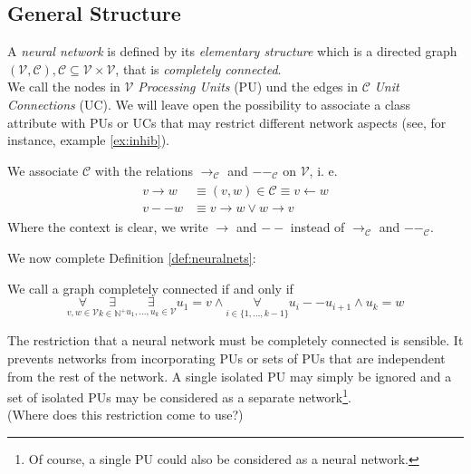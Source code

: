 \documentclass[a4paper,11pt]{article}
\begin{document}
\subsection{General Structure}
\begin{Def}\label{def:neuralnets}
A \emph{neural network} is defined by its \emph{elementary structure} which is a directed graph $(\mathcal{V},\mathcal{C}),\mathcal{C}\subseteq\mathcal{V}\times\mathcal{V}$, that is \emph{completely connected}.\\
We call the nodes in $\mathcal{V}$ \emph{Processing Units} (PU) und the edges in $\mathcal{C}$ \emph{Unit Connections} (UC). We will leave open the possibility to associate a class attribute with PUs or UCs that may restrict different network aspects (see, for instance, example \ref{ex:inhib}).
\end{Def}
\begin{Not}
We associate $\mathcal{C}$ with the relations $\to_{\mathcal{C}}$ and $--_{\mathcal{C}}$ on $\mathcal{V}$, i. e.
\begin{align}
\begin{split}
v\to w&\equiv(v,w)\in\mathcal{C}\equiv v\leftarrow w\\
v--w&\equiv v\to w\vee w\to v
\end{split}
\end{align}
Where the context is clear, we write $\to$ and $--$ instead of $\to_{\mathcal{C}}$ and $--_{\mathcal{C}}$.
\end{Not}
We now complete Definition \ref{def:neuralnets}:
\begin{Def}\label{def:connected}
We call a graph completely connected if and only if 
\begin{equation}
\underset{v,w\in\mathcal{V}}{\forall}\underset{k\in\mathbb{N}^+}{\exists}\underset{u_1,\dotsc,u_k\in\mathcal{V}}{\exists}u_1=v\wedge\underset{i\in\{1,\dotsc,k-1\}}{\forall}u_i--u_{i+1}\wedge u_k=w
\end{equation}
\end{Def}
\begin{Abs}
The restriction that a neural network must be completely connected is sensible. It prevents networks from incorporating PUs or sets of PUs that are independent from the rest of the network. A single isolated PU may simply be ignored and a set of isolated PUs may be considered as a separate network\footnote{
Of course, a single PU could also be considered as a neural network.}.\\
(Where does this restriction come to use?)
\end{Abs}
\end{document}
